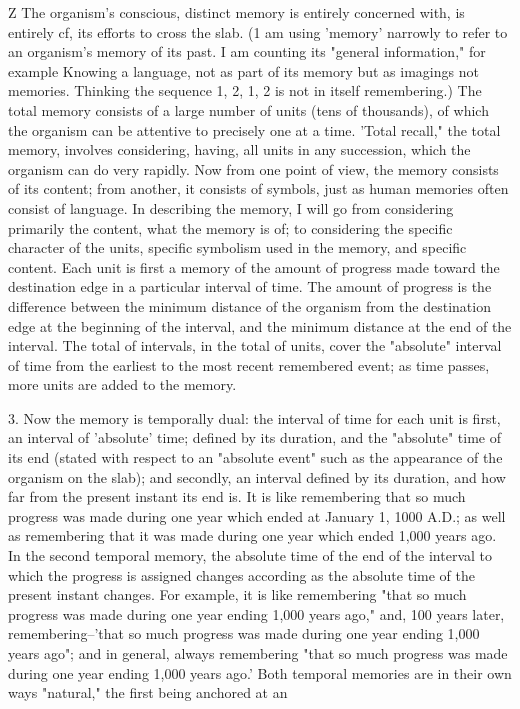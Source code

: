 \documentclass[10pt,twoside]{memoir}
\begin{document}
\begin{enumerate}
{\begin{enumerate}
\begin{sysrules}
\begin{sysrules}
\begin{sysrules}
\begin{sysrules}
{\begin{enumerate}
Z The organism's conscious, distinct memory is entirely concerned 
with, is entirely cf, its efforts to cross the slab. (1 am using 'memory' 
narrowly to refer to an organism's memory of its past. I am counting its 
"general information," for example Knowing a language, not as part of its 
memory but as imagings not memories. Thinking the sequence 1, 2, 1, 2 is 
not in itself remembering.) The total memory consists of a large number of 
units (tens of thousands), of which the organism can be attentive to precisely 
one at a time. 'Total recall," the total memory, involves considering, having, 
all units in any succession, which the organism can do very rapidly. Now 
from one point of view, the memory consists of its content; from another, it 
consists of symbols, just as human memories often consist of language. In 
describing the memory, I will go from considering primarily the content, 
what the memory is of; to considering the specific character of the units, 
specific symbolism used in the memory, and specific content. Each unit is 
first a memory of the amount of progress made toward the destination edge 
in a particular interval of time. The amount of progress is the difference 
between the minimum distance of the organism from the destination edge at 
the beginning of the interval, and the minimum distance at the end of the 
interval. The total of intervals, in the total of units, cover the "absolute" 
interval of time from the earliest to the most recent remembered event; as 
time passes, more units are added to the memory. 

3. Now the memory is temporally dual: the interval of time for each 
unit is first, an interval of 'absolute' time; defined by its duration, and the 
"absolute" time of its end (stated with respect to an "absolute event" such 
as the appearance of the organism on the slab); and secondly, an interval 
defined by its duration, and how far from the present instant its end is. It is 
like remembering that so much progress was made during one year which 
ended at January 1, 1000 A.D.; as well as remembering that it was made 
during one year which ended 1,000 years ago. In the second temporal 
memory, the absolute time of the end of the interval to which the progress is 
assigned changes according as the absolute time of the present instant 
changes. For example, it is like remembering "that so much progress was 
made during one year ending 1,000 years ago," and, 100 years later, 
remembering--'that so much progress was made during one year ending 
1,000 years ago"; and in general, always remembering "that so much 
progress was made during one year ending 1,000 years ago.' Both temporal 
memories are in their own ways "natural," the first being anchored at an 



\end{enumerate}}
\end{sysrules}
\end{sysrules}
\end{sysrules}
\end{sysrules}
\end{enumerate}}
\end{enumerate}
\end{document}
